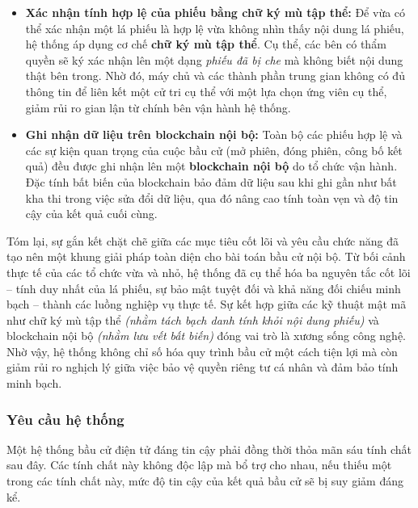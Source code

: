\begin{itemize}
    \item \textbf{Xác nhận tính hợp lệ của phiếu bằng chữ ký mù tập thể:} Để vừa có thể xác nhận một lá phiếu là hợp lệ vừa không nhìn thấy nội dung lá phiếu, hệ thống áp dụng cơ chế \textbf{chữ ký mù tập thể}. Cụ thể, các bên có thẩm quyền sẽ ký xác nhận lên một dạng \textit{phiếu đã bị che} mà không biết nội dung thật bên trong. Nhờ đó, máy chủ và các thành phần trung gian không có đủ thông tin để liên kết một cử tri cụ thể với một lựa chọn ứng viên cụ thể, giảm rủi ro gian lận từ chính bên vận hành hệ thống.

    \item \textbf{Ghi nhận dữ liệu trên blockchain nội bộ:} Toàn bộ các phiếu hợp lệ và các sự kiện quan trọng của cuộc bầu cử (mở phiên, đóng phiên, công bố kết quả) đều được ghi nhận lên một \textbf{blockchain nội bộ} do tổ chức vận hành. Đặc tính bất biến của blockchain bảo đảm dữ liệu sau khi ghi gần như bất kha thi trong việc sửa đổi dữ liệu, qua đó nâng cao tính toàn vẹn và độ tin cậy của kết quả cuối cùng.

\end{itemize}

Tóm lại, sự gắn kết chặt chẽ giữa các mục tiêu cốt lõi và yêu cầu chức năng đã tạo nên một khung giải pháp toàn diện cho bài toán bầu cử nội bộ. Từ bối cảnh thực tế của các tổ chức vừa và nhỏ, hệ thống đã cụ thể hóa ba nguyên tắc cốt lõi -- tính duy nhất của lá phiếu, sự bảo mật tuyệt đối và khả năng đối chiếu minh bạch -- thành các luồng nghiệp vụ thực tế. Sự kết hợp giữa các kỹ thuật mật mã như chữ ký mù tập thể \textit{(nhằm tách bạch danh tính khỏi nội dung phiếu)} và blockchain nội bộ \textit{(nhằm lưu vết bất biến)} đóng vai trò là xương sống công nghệ. Nhờ vậy, hệ thống không chỉ số hóa quy trình bầu cử một cách tiện lợi mà còn giảm rủi ro nghịch lý giữa việc bảo vệ quyền riêng tư cá nhân và đảm bảo tính minh bạch.

\subsubsection{Yêu cầu hệ thống}

Một hệ thống bầu cử điện tử đáng tin cậy phải đồng thời thỏa mãn sáu tính chất sau đây. Các tính chất này không độc lập mà bổ trợ cho nhau, nếu thiếu một trong các tính chất này, mức độ tin cậy của kết quả bầu cử sẽ bị suy giảm đáng kể.

